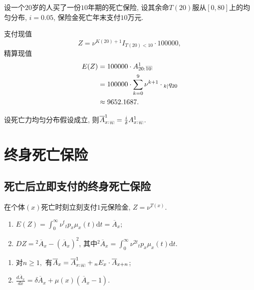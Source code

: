 \documentclass[lang=cn,10pt]{elegantbook}
\makeatletter
\DeclareRobustCommand{\annu}[1]{_{%
    \def\arraystretch{0}%
    \setlength\arraycolsep{1pt}%
    \setlength\arrayrulewidth{.2pt}%
    \begin{array}[b]{@{}c|}\hline
        \\[\arraycolsep]%
        \scriptstyle #1%
    \end{array}%
}}
\makeatother
\begin{document}
\begin{example}
    设一个$20$岁的人买了一份$10$年期的死亡保险, 设其余命$T(20)$服从$[0,80]$上的均匀分布, $i = 0.05$, 保险金死亡年末支付$10$万元.
\end{example}
\begin{solution}
    支付现值
    $$
        Z = \nu^{K(20)+1}I_{T(20)<10}\cdot 100000,
    $$
    精算现值
    \begin{align*}
        E(Z) & = 100000\cdot A_{20:}^1{}\annu{10}                         \\
             & = 100000\cdot \sum_{k=0}^{9}{\nu^{k+1}\cdot {}_{k|}q_{20}} \\
             & \approx 9652.1687.
    \end{align*}
\end{solution}

\begin{proposition}[死亡年末支付与死亡立即支付的关系]
    设死亡力均匀分布假设成立, 则$\overline{A}_{x:}^1{}_{\annu{n}}= \frac{i}{\delta}A_{x:}^1{}_{\annu{n}}$.
\end{proposition}

\section{终身死亡保险}
\subsection{死亡后立即支付的终身死亡保险}
\begin{definition}[支付现值]
    在个体$(x)$死亡时刻立刻支付$1$元保险金, $Z = \nu^{T(x)}.$
\end{definition}

\begin{proposition}[精算现值与方差]
    \begin{enumerate}
        \item $E(Z) = \int_0^\infty \nu^t{}_tp_x\mu_x(t)\mathrm{d}t = \overline{A}_x;$
        \item $DZ = {}^2\overline{A}_x - (\overline{A}_x)^2$, 其中${}^2\overline{A}_x = \int_0^\infty \nu^{2t}{}_tp_x\mu_x(t)\mathrm{d}t$.
    \end{enumerate}
\end{proposition}

\begin{corollary}[精算现值的性质]
    \begin{enumerate}
        \item 对$n\ge1,$ 有$\overline{A}_x = \overline{A}_{x:}^1{}_{\annu{n}} + {}_nE_{x}\cdot \overline{A}_{x+n}$;
        \item $\frac{d\overline{A}_x}{dx} = \delta \overline{A}_x + \mu(x)(\overline{A}_x - 1).$
    \end{enumerate}
\end{corollary}
\end{document}
